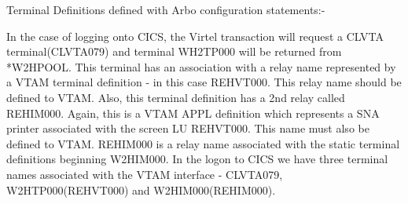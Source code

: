 \documentclass[letterpaper,10pt,english]{sphinxmanual}
\begin{document}

Terminal Definitions defined with Arbo configuration statements:-

\begin{sphinxVerbatim}[commandchars=\\\{\}]
                          

                          
\PYGZbs{}                                

                          
\PYGZbs{}                                 
\end{sphinxVerbatim}

In the case of logging onto CICS, the Virtel transaction will request a CLVTA terminal(CLVTA079) and terminal WH2TP000 will be returned from *W2HPOOL. This terminal has an association with a relay name represented by a VTAM terminal definition - in this case REHVT000. This relay name should be defined to VTAM. Also, this terminal definition has a 2nd relay called REHIM000. Again, this is a VTAM APPL definition which represents a SNA printer associated with the screen LU REHVT000. This name must also be defined to VTAM. REHIM000 is a relay name associated with the static terminal definitions beginning W2HIM000. In the logon to CICS we have three terminal names associated with the VTAM interface - CLVTA079, W2HTP000(REHVT000) and W2HIM000(REHIM000).
\end{document}

